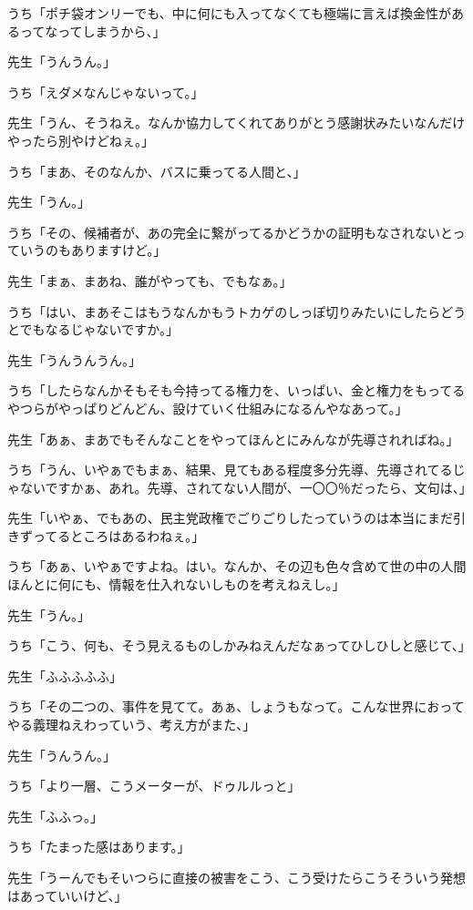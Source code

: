 \documentclass[b5j,twoside,twocolumn]{utarticle}
\begin{document}
\begin{description}
\item うち「ポチ袋オンリーでも、中に何にも入ってなくても極端に言えば換金性があるってなってしまうから、」
\item 先生「うんうん。」
\item うち「えダメなんじゃないって。」
\item 先生「うん、そうねえ。なんか協力してくれてありがとう感謝状みたいなんだけやったら別やけどねぇ。」
\item うち「まあ、そのなんか、バスに乗ってる人間と、」
\item 先生「うん。」
\item うち「その、候補者が、あの完全に繋がってるかどうかの証明もなされないとっていうのもありますけど。」
\item 先生「まぁ、まあね、誰がやっても、でもなぁ。」
\item うち「はい、まあそこはもうなんかもうトカゲのしっぽ切りみたいにしたらどうとでもなるじゃないですか。」
\item 先生「うんうんうん。」
\item うち「したらなんかそもそも今持ってる権力を、いっぱい、金と権力をもってるやつらがやっぱりどんどん、設けていく仕組みになるんやなあって。」
\item 先生「あぁ、まあでもそんなことをやってほんとにみんなが先導されればね。」
\item うち「うん、いやぁでもまぁ、結果、見てもある程度多分先導、先導されてるじゃないですかぁ、あれ。先導、されてない人間が、一〇〇％だったら、文句は、」
\item 先生「いやぁ、でもあの、民主党政権でごりごりしたっていうのは本当にまだ引きずってるところはあるわねぇ。」
\item うち「あぁ、いやぁですよね。はい。なんか、その辺も色々含めて世の中の人間ほんとに何にも、情報を仕入れないしものを考えねえし。」
\item 先生「うん。」
\item うち「こう、何も、そう見えるものしかみねえんだなぁってひしひしと感じて、」
\item 先生「ふふふふふ」
\item うち「その二つの、事件を見てて。あぁ、しょうもなって。こんな世界におってやる義理ねえわっていう、考え方がまた、」
\item 先生「うんうん。」
\item うち「より一層、こうメーターが、ドゥルルっと」
\item 先生「ふふっ。」
\item うち「たまった感はあります。」
\item 先生「うーんでもそいつらに直接の被害をこう、こう受けたらこうそういう発想はあっていいけど、」

\end{description}
\end{document}
